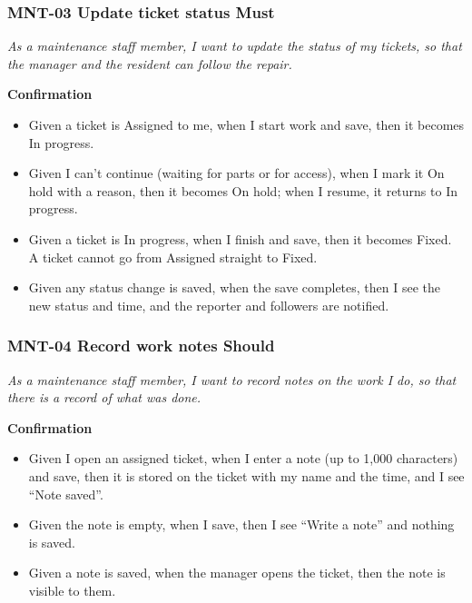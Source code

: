 \documentclass[11pt,a4paper]{report}
\begin{document}
\subsubsection*{MNT-03 \textperiodcentered{} Update ticket status \textperiodcentered{} Must}

\emph{As a maintenance staff member, I want to update the status of my tickets, so that the manager and the resident can follow the repair.}

\medskip\noindent\textbf{Confirmation}\par

\begin{itemize}
  \item Given a ticket is Assigned to me, when I start work and save, then it becomes In progress.
  \item Given I can't continue (waiting for parts or for access), when I mark it On hold with a reason, then it becomes On hold; when I resume, it returns to In progress.
  \item Given a ticket is In progress, when I finish and save, then it becomes Fixed. A ticket cannot go from Assigned straight to Fixed.
  \item Given any status change is saved, when the save completes, then I see the new status and time, and the reporter and followers are notified.
\end{itemize}

\subsubsection*{MNT-04 \textperiodcentered{} Record work notes \textperiodcentered{} Should}

\emph{As a maintenance staff member, I want to record notes on the work I do, so that there is a record of what was done.}

\medskip\noindent\textbf{Confirmation}\par

\begin{itemize}
  \item Given I open an assigned ticket, when I enter a note (up to 1,000 characters) and save, then it is stored on the ticket with my name and the time, and I see ``Note saved''.
  \item Given the note is empty, when I save, then I see ``Write a note'' and nothing is saved.
  \item Given a note is saved, when the manager opens the ticket, then the note is visible to them.
\end{itemize}
\end{document}
